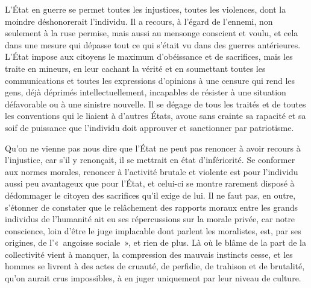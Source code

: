 
{L'État en guerre se permet toutes les injustices, toutes les
violences, dont la moindre déshonorerait l'individu. Il a recours, à
l'égard de l'ennemi, non seulement à la ruse permise, mais aussi au
mensonge conscient et voulu, et cela dans une mesure qui dépasse tout
ce qui s'était vu dans des guerres antérieures. L'État impose aux
citoyens le maximum d'obéissance et de sacrifices, mais les traite
en mineurs, en leur cachant la vérité et en soumettant toutes les
communications et toutes les expressions d'opinions à une censure qui
rend les gens, déjà déprimés intellectuellement, incapables de
résister à une situation défavorable ou à une sinistre nouvelle. Il
se dégage de tous les traités et de toutes les conventions qui le
liaient à d'autres États, avoue sans crainte sa rapacité et sa soif
de puissance que l'individu doit approuver et sanctionner par
patriotisme.

Qu'on ne vienne pas nous dire que l'État ne peut pas renoncer à avoir
recours à l'injustice, car s'il y renonçait, il se mettrait en état
d'infériorité. Se conformer aux normes morales, renoncer à l'activité
brutale et violente est pour l'individu aussi peu avantageux que pour
l'État, et celui-ci se montre rarement disposé à dédommager le
citoyen des sacrifices qu'il exige de lui. Il ne faut pas, en outre,
s'étonner de constater que le relâchement des rapports moraux entre
les grands individus de l'humanité ait eu ses répercussions sur la
morale privée, car notre conscience, loin d'être le juge implacable
dont parlent les moralistes, est, par ses origines, de l'«~angoisse
sociale~», et rien de plus. Là où le blâme de la part de la
collectivité vient à manquer, la compression des mauvais instincts
cesse, et les hommes se livrent à des actes de cruauté, de perfidie,
de trahison et de brutalité, qu'on aurait crus impossibles, à en
juger uniquement par leur niveau de culture.
}

